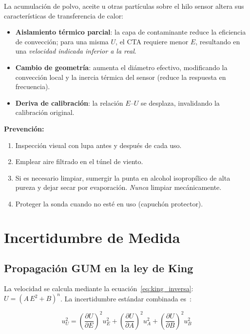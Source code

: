 \documentclass[12pt,a4paper]{article}
\begin{document}
La acumulación de polvo, aceite u otras partículas sobre el hilo sensor
altera sus características de transferencia de calor:

\begin{itemize}
	\item \textbf{Aislamiento térmico parcial}: la capa de contaminante reduce
	      la eficiencia de convección; para una misma $U$, el CTA requiere
	      menor $E$, resultando en una \emph{velocidad indicada inferior a la
		      real}.
	\item \textbf{Cambio de geometría}: aumenta el diámetro efectivo,
	      modificando la convección local y la inercia térmica del sensor
	      (reduce la respuesta en frecuencia).
	\item \textbf{Deriva de calibración}: la relación $E$--$U$ se desplaza,
	      invalidando la calibración original.
\end{itemize}

\textbf{Prevención:}
\begin{enumerate}
	\item Inspección visual con lupa antes y después de cada uso.
	\item Emplear aire filtrado en el túnel de viento.
	\item Si es necesario limpiar, sumergir la punta en alcohol isopropílico
	      de alta pureza y dejar secar por evaporación. \emph{Nunca} limpiar
	      mecánicamente.
	\item Proteger la sonda cuando no esté en uso (capuchón protector).
\end{enumerate}

\section{Incertidumbre de Medida}
\label{sec:incertidumbre}

\subsection{Propagación GUM en la ley de King}

La velocidad se calcula mediante la ecuación~\eqref{eq:king_inversa}:
$U = (A\,E^2 + B)^n$.  La incertidumbre estándar combinada
es~\cite{gum2008}:

\begin{equation}
	u_U^2 = \left(\frac{\partial U}{\partial E}\right)^2 u_E^2
	+ \left(\frac{\partial U}{\partial A}\right)^2 u_A^2
	+ \left(\frac{\partial U}{\partial B}\right)^2 u_B^2
	\label{eq:uU_GUM}
\end{equation}
\end{document}
